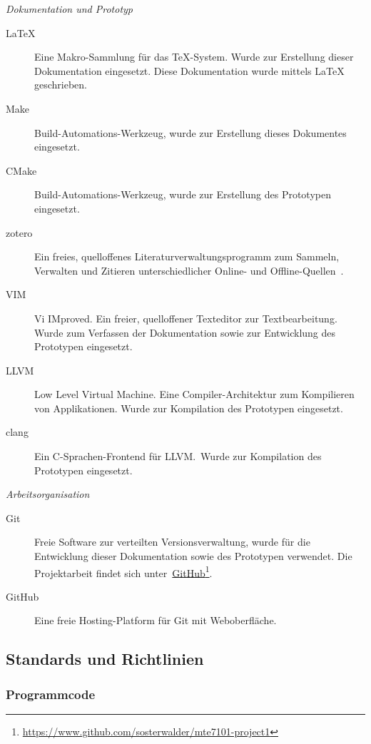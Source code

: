 \noindent\emph{Dokumentation und Prototyp}
\begin{description}
    \item[\LaTeX] Eine Makro-Sammlung für das \TeX-System. Wurde zur
        Erstellung dieser Dokumentation eingesetzt. Diese Dokumentation
        wurde mittels \LaTeX{} geschrieben.
    \item[Make] Build-Automations-Werkzeug, wurde zur Erstellung dieses Dokumentes eingesetzt.
    \item[CMake] Build-Automations-Werkzeug, wurde zur Erstellung des
        Prototypen eingesetzt.
    \item[zotero] Ein freies, quelloffenes Literaturverwaltungsprogramm
        zum Sammeln, Verwalten und Zitieren unterschiedlicher Online-
        und Offline-Quellen~\parencite{wikipedia_foundation_zotero_2015}.
    \item[VIM] Vi IMproved. Ein freier, quelloffener Texteditor zur
        Textbearbeitung. Wurde zum Verfassen der Dokumentation sowie zur
        Entwicklung des Prototypen eingesetzt.
    \item[LLVM] Low Level Virtual Machine. Eine Compiler-Architektur zum
        Kompilieren von Applikationen. Wurde zur Kompilation des
        Prototypen eingesetzt.
    \item[clang] Ein C-Sprachen-Frontend für LLVM.\ Wurde zur Kompilation
        des Prototypen eingesetzt.
\end{description}


\noindent\emph{Arbeitsorganisation}
\begin{description}
    \item[Git] Freie Software zur verteilten Versionsverwaltung, wurde
        für die Entwicklung dieser Dokumentation sowie des Prototypen verwendet. Die
        Projektarbeit findet sich
        unter~\href{https://www.github.com/sosterwalder/mte7101-project1}{GitHub}\footnote{
            \href{https://www.github.com/sosterwalder/mte7101-project1}{https://www.github.com/sosterwalder/mte7101-project1}
        }.
    \item[GitHub] Eine freie Hosting-Platform für Git mit Weboberfläche.
\end{description}

\subsection{Standards und Richtlinien}
\label{subsec:standards_guidelines}

\subsubsection{Programmcode}
\label{ssubsec:standards_guidelines:code}

